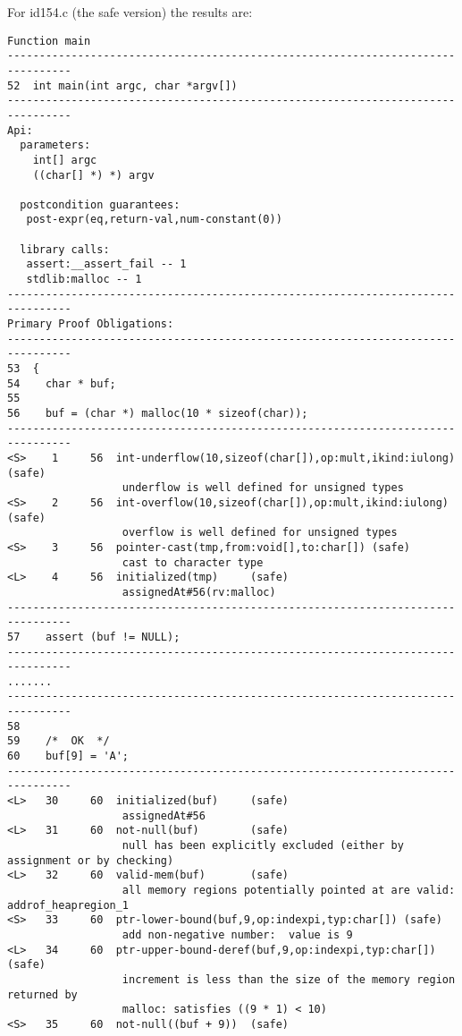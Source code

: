 \documentclass[11pt]{article}
\begin{document}
For id154.c (the safe version) the results are:
\begin{scriptsize}
\begin{verbatim}
Function main
--------------------------------------------------------------------------------
52  int main(int argc, char *argv[])
--------------------------------------------------------------------------------
Api:
  parameters:
    int[] argc
    ((char[] *) *) argv

  postcondition guarantees:
   post-expr(eq,return-val,num-constant(0))

  library calls:
   assert:__assert_fail -- 1
   stdlib:malloc -- 1
--------------------------------------------------------------------------------
Primary Proof Obligations:
--------------------------------------------------------------------------------
53  {
54    char * buf;
55
56    buf = (char *) malloc(10 * sizeof(char));
--------------------------------------------------------------------------------
<S>    1     56  int-underflow(10,sizeof(char[]),op:mult,ikind:iulong) (safe)
                  underflow is well defined for unsigned types
<S>    2     56  int-overflow(10,sizeof(char[]),op:mult,ikind:iulong) (safe)
                  overflow is well defined for unsigned types
<S>    3     56  pointer-cast(tmp,from:void[],to:char[]) (safe)
                  cast to character type
<L>    4     56  initialized(tmp)     (safe)
                  assignedAt#56(rv:malloc)
--------------------------------------------------------------------------------
57    assert (buf != NULL);
--------------------------------------------------------------------------------
.......
--------------------------------------------------------------------------------
58
59    /*  OK  */
60    buf[9] = 'A';
--------------------------------------------------------------------------------
<L>   30     60  initialized(buf)     (safe)
                  assignedAt#56
<L>   31     60  not-null(buf)        (safe)
                  null has been explicitly excluded (either by assignment or by checking)
<L>   32     60  valid-mem(buf)       (safe)
                  all memory regions potentially pointed at are valid: addrof_heapregion_1
<S>   33     60  ptr-lower-bound(buf,9,op:indexpi,typ:char[]) (safe)
                  add non-negative number:  value is 9
<L>   34     60  ptr-upper-bound-deref(buf,9,op:indexpi,typ:char[]) (safe)
                  increment is less than the size of the memory region returned by 
                  malloc: satisfies ((9 * 1) < 10)
<S>   35     60  not-null((buf + 9))  (safe)

\end{verbatim}
\end{scriptsize}
\end{document}
